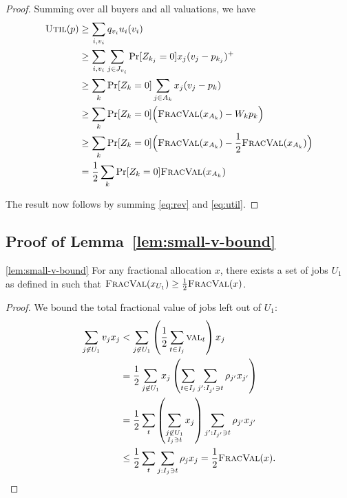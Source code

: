 \begin{proof}
    Summing over all buyers and all valuations, we have
    \begin{align}
        \util(\price)  &\ge \sum_{i,\vali}\qvi u_i(\vali) \nonumber \\
              &\ge \sum_{i,\vali}\sum_{j\in\Jvi}\Pr[Z_{k_j}=0]\xj(\vj -
                  \price[k_j])^+ \nonumber \\
              &\ge \sum_k \Pr[Z_k=0]\sum_{j\in A_k} \xj(\vj - \pricek) 
                  \nonumber \\
              &\ge \sum_k \Pr[Z_k=0]
                \Big(\fval(x_{A_k})-W_k\pricek  \Big) 
                  \nonumber \\
              &\ge \sum_k \Pr[Z_k=0]
                \Big(\fval(x_{A_k})-\frac 12 \fval(x_{A_k})\Big) 
                  \nonumber \\
              &= \half \sum_k \Pr[Z_k=0] \fval(x_{A_k}) \label{eq:util}
    \end{align}

    The result now follows by summing \eqref{eq:rev} and \eqref{eq:util}.
\end{proof}

\subsection{Proof of Lemma~\ref{lem:small-v-bound}}

\begin{numberedlemma}{\ref{lem:small-v-bound}}
For any fractional allocation $x$, there exists a set of jobs $U_1$ as defined
in  such that $\fval(x_{U_1})\ge \half\fval(x)$.
\end{numberedlemma}
\begin{proof}
We bound the total fractional value of jobs left out of $U_1$:
    \begin{align*}
        \sum_{j\not\in U_1} v_jx_j &< \sum_{j\not\in U_1} 
                \left(\half\sum_{t\in I_j}\fvt\right) x_j \\
            &= \half \sum_{j\not\in U_1} x_j \left(\sum_{t\in I_j}
                \sum_{j' : I_{j'} \ni t} \densj[j'] x_{j'} \right) \\
            &= \half \sum_t\left(\sum_{\substack{j\not\in U_1\\I_j\ni t}}x_j\right)
                \sum_{j' : I_{j'} \ni t} \densj[j'] x_{j'} \\
            &\le \half \sum_t\sum_{j : I_j \ni t} \densj x_j = \half \fval(x).
    \end{align*}
\end{proof}

